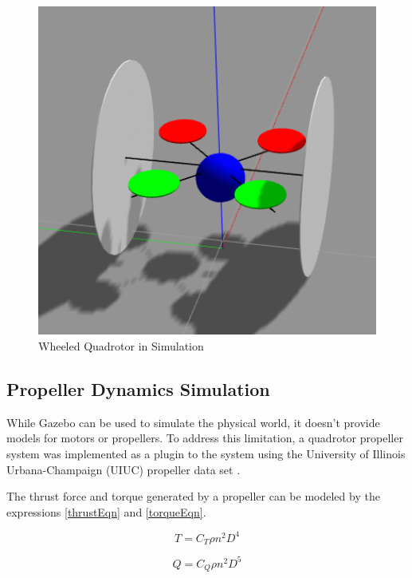 \documentclass[12pt,a4paper]{report}
\begin{document}
\begin{figure}
\centering
	\includegraphics[width=1\textwidth,clip=true,trim=17 50 5 17]{images/simulation}
	\caption{Wheeled Quadrotor in Simulation\label{quad_sim}}
\end{figure}

\subsection{Propeller Dynamics Simulation}
\label{propellerSimulation}
While Gazebo can be used to simulate the physical world, it doesn't provide models for motors or propellers. To address this limitation, a quadrotor propeller system was implemented as a plugin to the system using the University of Illinois Urbana-Champaign (UIUC) propeller data set \cite{brandt_deters_ananda_selig_2017}.\par

The thrust force and torque generated by a propeller can be modeled by the expressions \ref{thrustEqn} and \ref{torqueEqn}.\par

\begin{equation}
\label{thrustEqn}
T = C_{T} \rho n^2  D^4
\end{equation}

\begin{equation}
\label{torqueEqn}
Q = C_{Q} \rho n^2 D^5
\end{equation}
\end{document}
